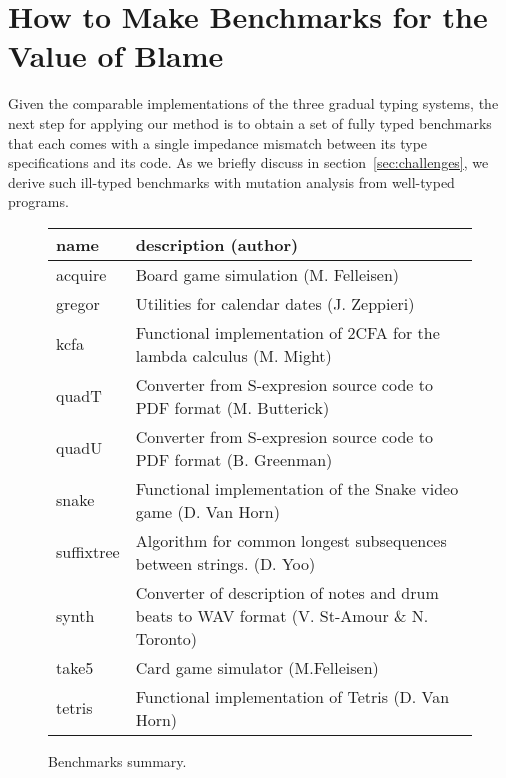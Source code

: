 \section{How to Make Benchmarks for the Value of Blame} \label{sec:mutate}

Given the comparable implementations of the three gradual typing systems,
the next step for applying our method is to obtain a set of fully
typed benchmarks that each comes with a single impedance mismatch between
its type specifications and its code. As we briefly discuss in
section~\ref{sec:challenges}, we derive such ill-typed benchmarks with
mutation analysis from well-typed programs.  





\begin{figure}
\begin{tabular}{p{1.5cm} | p{10cm} }
  {\bf  name} & {\bf description (author)}  \\

\hline

acquire & Board game simulation (M. Felleisen)  \\%


\hline
  gregor & Utilities for calendar dates (J. Zeppieri) \\%


\hline
kcfa & Functional implementation of 2CFA for the lambda calculus (M. Might) \\%


\hline
quadT & Converter from S-expresion source code to PDF format (M. Butterick)\\%
    
\hline
quadU & Converter from S-expresion source code to PDF format  (B. Greenman) \\%

\hline
snake & Functional implementation of the  Snake video game (D. Van Horn) \\%

\hline
suffixtree & Algorithm for common longest subsequences between strings. (D. Yoo) \\%

\hline
synth & Converter of description of notes and drum beats to WAV format (V. St-Amour \& N. Toronto) \\%

\hline
take5 & Card game simulator (M.Felleisen)  \\%

\hline
tetris & Functional implementation of Tetris (D. Van Horn) \\%


\end{tabular}
  \caption{Benchmarks summary.}
  \label{table:benchmark-descriptions}
\end{figure}


